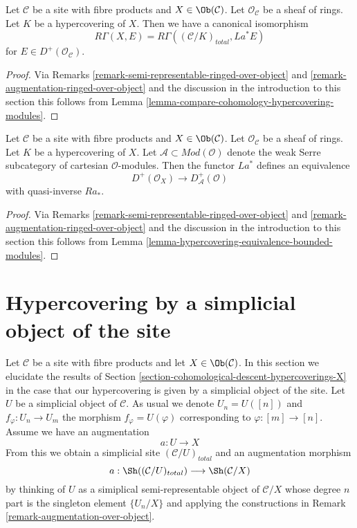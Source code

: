\begin{lemma}
\label{lemma-compare-cohomology-hypercovering-X-modules}
Let $\mathcal{C}$ be a site with fibre products and $X \in \Ob(\mathcal{C})$.
Let $\mathcal{O}_\mathcal{C}$ be a sheaf of rings.
Let $K$ be a hypercovering of $X$.
Then we have a canonical isomorphism
$$
R\Gamma(X, E) = R\Gamma((\mathcal{C}/K)_{total}, La^*E)
$$
for $E \in D^+(\mathcal{O}_\mathcal{C})$.
\end{lemma}

\begin{proof}
Via Remarks \ref{remark-semi-representable-ringed-over-object} and
\ref{remark-augmentation-ringed-over-object} and the discussion in
the introduction to this section
this follows from Lemma \ref{lemma-compare-cohomology-hypercovering-modules}.
\end{proof}

\begin{lemma}
\label{lemma-hypercovering-X-equivalence-bounded-modules}
Let $\mathcal{C}$ be a site with fibre products and $X \in \Ob(\mathcal{C})$.
Let $\mathcal{O}_\mathcal{C}$ be a sheaf of rings.
Let $K$ be a hypercovering of $X$.
Let $\mathcal{A} \subset \textit{Mod}(\mathcal{O})$
denote the weak Serre subcategory of cartesian $\mathcal{O}$-modules.
Then the functor $La^*$ defines an equivalence
$$
D^+(\mathcal{O}_X) \longrightarrow D_\mathcal{A}^+(\mathcal{O})
$$
with quasi-inverse $Ra_*$.
\end{lemma}

\begin{proof}
Via Remarks \ref{remark-semi-representable-ringed-over-object} and
\ref{remark-augmentation-ringed-over-object} and the discussion in
the introduction to this section
this follows from Lemma \ref{lemma-hypercovering-equivalence-bounded-modules}.
\end{proof}










\section{Hypercovering by a simplicial object of the site}
\label{section-hypercovering}

\noindent
Let $\mathcal{C}$ be a site with fibre products and
let $X \in \Ob(\mathcal{C})$.
In this section we elucidate the results of
Section \ref{section-cohomological-descent-hypercoverings-X}
in the case that our hypercovering is given by
a simplicial object of the site.
Let $U$ be a simplicial object of $\mathcal{C}$.
As usual we denote $U_n = U([n])$ and $f_\varphi : U_n \to U_m$
the morphism $f_\varphi = U(\varphi)$ corresponding to
$\varphi : [m] \to [n]$.
Assume we have an augmentation
$$
a : U \to X
$$
From this we obtain a simplicial site $(\mathcal{C}/U)_{total}$
and an augmentation morphism
$$
a : \Sh((\mathcal{C}/U)_{total}) \longrightarrow \Sh(\mathcal{C}/X)
$$
by thinking of $U$ as a simiplical semi-representable
object of $\mathcal{C}/X$ whose degree $n$ part is the singleton
element $\{U_n/X\}$ and applying the constructions in
Remark \ref{remark-augmentation-over-object}.

